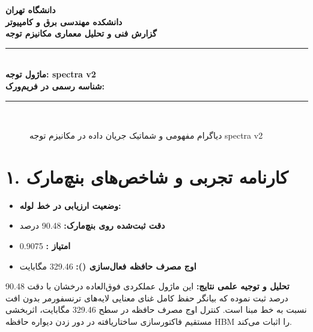 \documentclass[12pt,a4paper]{article}
\begin{document}
\begin{center}
{\Large\bfseries دانشگاه تهران}\\[0.2cm]
{\large\bfseries دانشکده مهندسی برق و کامپیوتر}\\[0.2cm]
{\large\bfseries گزارش فنی و تحلیل معماری مکانیزم توجه}\\[0.5cm]
\rule{\linewidth}{1pt}\\[0.3cm]
{\LARGE\bfseries ماژول توجه: spectra v2}\\[0.2cm]
{\large \textbf{شناسه رسمی در فریم‌ورک:} }\\[0.2cm]
\rule{\linewidth}{1pt}\\[0.5cm]
\end{center}

\begin{figure}[H]
\centering
{}
\caption{دیاگرام مفهومی و شماتیک جریان داده در مکانیزم توجه spectra v2}
\end{figure}

\section*{۱. کارنامه تجربی و شاخص‌های بنچ‌مارک}
\begin{itemize}
\item \textbf{وضعیت ارزیابی در خط لوله:} 
\item \textbf{دقت ثبت‌شده روی بنچ‌مارک:} 90.48 درصد
\item \textbf{امتیاز :} 0.9075
\item \textbf{اوج مصرف حافظه فعال‌سازی ():} 329.46 مگابایت
\end{itemize}
\textbf{تحلیل و توجیه علمی نتایج:} این ماژول عملکردی فوق‌العاده درخشان با دقت 90.48 درصد ثبت نموده که بیانگر حفظ کامل غنای معنایی لایه‌های ترنسفورمر بدون افت نسبت به خط مبنا است. کنترل اوج مصرف حافظه در سطح 329.46 مگابایت، اثربخشی مستقیم فاکتورسازی ساختاریافته در دور زدن دیواره حافظه HBM را اثبات می‌کند.
\end{document}
